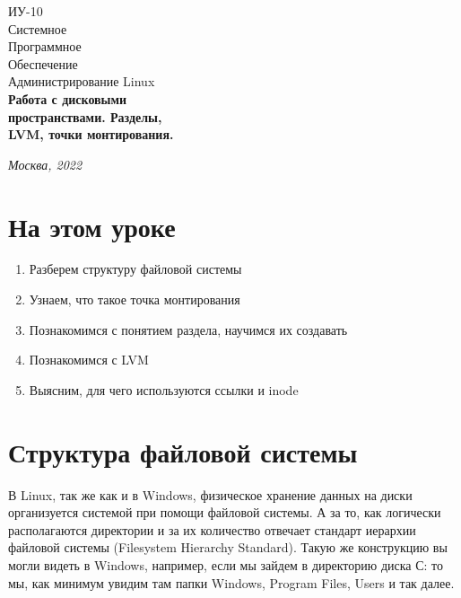 \documentclass[14pt, a4paper]{article}
\begin{document}
\begin{titlepage}
    \topmargin=216pt
    \newpage
    \hangindent=0.7cm
    \huge ИУ-10\\
    Системное\\
    Программное\\
    Обеспечение\\
    Администрирование Linux\\
    \textbf{Работа с дисковыми \\
    пространствами. Разделы,\\
    LVM, точки монтирования.}

    \vspace{8cm}

    \begin{center}
        \small\textit{Москва, 2022}
    \end{center}
\end{titlepage}

\section*{На этом уроке} 

\begin{enumerate}
    \item Разберем структуру файловой системы
    \item Узнаем, что такое точка монтирования
    \item Познакомимся с понятием раздела, научимся их создавать
    \item Познакомимся с LVM
    \item Выясним, для чего используются ссылки и inode
\end{enumerate}


\tableofcontents
\newpage

\section*{Структура файловой системы} 

В Linux, так же как и в Windows, физическое хранение данных на диски организуется системой при
помощи файловой системы. А за то, как логически располагаются директории и за их количество
отвечает стандарт иерархии файловой системы (Filesystem Hierarchy Standard). Такую же конструкцию
вы могли видеть в Windows, например, если мы зайдем в директорию диска С: то мы, как минимум
увидим там папки Windows, Program Files, Users и так далее.\\
\end{document}
